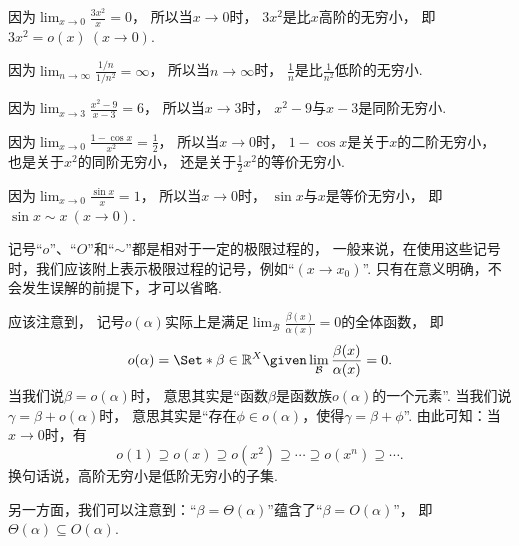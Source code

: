 \begin{example}
因为\(\lim_{x\to0} \frac{3x^2}{x} = 0\)，
所以当\(x\to0\)时，
\(3x^2\)是比\(x\)高阶的无穷小，
即\(3x^2 = o(x)\ (x\to0)\).
\end{example}

\begin{example}
因为\(\lim_{n\to\infty} \frac{1/n}{1/n^2} = \infty\)，
所以当\(n\to\infty\)时，
\(\frac{1}{n}\)是比\(\frac{1}{n^2}\)低阶的无穷小.
\end{example}

\begin{example}
因为\(\lim_{x\to3} \frac{x^2-9}{x-3} = 6\)，
所以当\(x\to3\)时，
\(x^2-9\)与\(x-3\)是同阶无穷小.
\end{example}

\begin{example}
因为\(\lim_{x\to0} \frac{1-\cos x}{x^2} = \frac{1}{2}\)，
所以当\(x\to0\)时，
\(1-\cos x\)是关于\(x\)的二阶无穷小，
也是关于\(x^2\)的同阶无穷小，
还是关于\(\frac12 x^2\)的等价无穷小.
\end{example}

\begin{example}
因为\(\lim_{x\to0} \frac{\sin x}{x} = 1\)，
所以当\(x\to0\)时，
\(\sin x\)与\(x\)是等价无穷小，
即\(\sin x \sim x\ (x\to0)\).
\end{example}

\begin{remark}
记号“\(o\)”、“\(O\)”和“\(\sim\)”都是相对于一定的极限过程的，
一般来说，在使用这些记号时，我们应该附上表示极限过程的记号，例如“\((x \to x_0)\)”.
只有在意义明确，不会发生误解的前提下，才可以省略.
\end{remark}
\begin{remark}
应该注意到，
记号\(o(\alpha)\)实际上是满足\(\lim_\mathcal{B} \frac{\beta(x)}{\alpha(x)} = 0\)的全体函数，
即\[
	o(\alpha) = \Set*{ \beta\in\mathbb{R}^X \given \lim_\mathcal{B} \frac{\beta(x)}{\alpha(x)} = 0 }.
\]
当我们说\(\beta = o(\alpha)\)时，
意思其实是“函数\(\beta\)是函数族\(o(\alpha)\)的一个元素”.
当我们说\(\gamma = \beta + o(\alpha)\)时，
意思其实是“存在\(\phi\in o(\alpha)\)，使得\(\gamma = \beta + \phi\)”.
由此可知：当\(x\to0\)时，有\[
	o(1)
	\supseteq o(x)
	\supseteq o(x^2)
	\supseteq \dotsb
	\supseteq o(x^n)
	\supseteq \dotsb.
\]
换句话说，高阶无穷小是低阶无穷小的子集.

另一方面，我们可以注意到：“\(\beta = \Theta(\alpha)\)”蕴含了“\(\beta = O(\alpha)\)”，
即\(\Theta(\alpha) \subseteq O(\alpha)\).
\end{remark}

